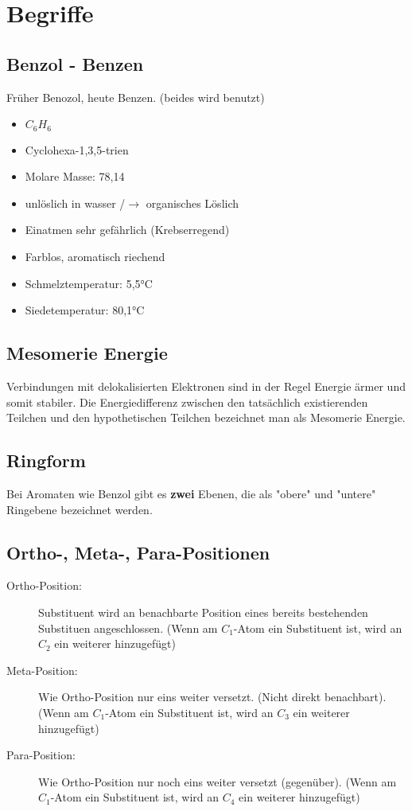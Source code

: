 \section{Begriffe}

\subsection{Benzol - Benzen}
Früher Benozol, heute Benzen. (beides wird benutzt)
\begin{multicols}{2}
\begin{itemize}
    \item $C_6H_6$
    \item Cyclohexa-1,3,5-trien
    \item Molare Masse: 78,14
    \item unlöslich in wasser /$\rightarrow$ organisches Löslich
    \item Einatmen sehr gefährlich (Krebserregend)
    \item Farblos, aromatisch riechend
    \item Schmelztemperatur: 5,5°C
    \item Siedetemperatur: 80,1°C
\end{itemize}
\end{multicols}


\subsection{Mesomerie Energie} \label{sec:mesomerie}
Verbindungen mit delokalisierten Elektronen sind in der 
Regel Energie ärmer und somit stabiler. 
Die Energiedifferenz zwischen den tatsächlich existierenden 
Teilchen und den hypothetischen Teilchen bezeichnet man als 
Mesomerie Energie.


\subsection{Ringform}
Bei Aromaten wie Benzol gibt es \textbf{zwei} Ebenen, die als "obere" und "untere" Ringebene bezeichnet werden. 


\subsection{Ortho-, Meta-, Para-Positionen}
\begin{description}
    \item[Ortho-Position:] Substituent wird an benachbarte Position eines bereits bestehenden Substituen angeschlossen. (Wenn am $C_1$-Atom ein Substituent ist, wird an $C_2$ ein weiterer hinzugefügt)
    \item[Meta-Position:] Wie Ortho-Position nur eins weiter versetzt. (Nicht direkt benachbart). (Wenn am $C_1$-Atom ein Substituent ist, wird an $C_3$ ein weiterer hinzugefügt)
    \item[Para-Position:] Wie Ortho-Position nur noch eins weiter versetzt (gegenüber). (Wenn am $C_1$-Atom ein Substituent ist, wird an $C_4$ ein weiterer hinzugefügt)
\end{description}


